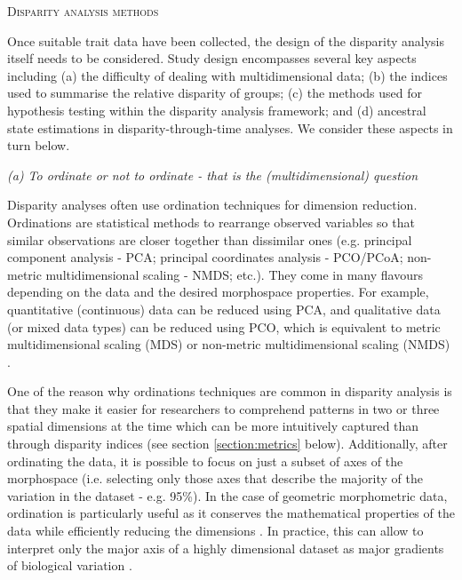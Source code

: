 \documentclass[12pt,letterpaper]{article}
\renewcommand{\section}[1]{%
\bigskip
\begin{center}
\begin{Large}
\normalfont\scshape #1
\medskip
\end{Large}
\end{center}}
\renewcommand{\subsection}[1]{%
\bigskip
\begin{center}
\begin{large}
\normalfont\itshape #1
\end{large}
\end{center}}
\begin{document}
\section{Disparity analysis methods}
\label{section:methods}

\noindent Once suitable trait data have been collected, the design of the disparity analysis itself needs to be considered.
Study design encompasses several key aspects including (a) the difficulty of dealing with multidimensional data; (b) the indices used to summarise the relative disparity of groups; (c) the methods used for hypothesis testing within the disparity analysis framework; and (d) ancestral state estimations in disparity-through-time analyses.
We consider these aspects in turn below.

\subsection{(a) To ordinate or not to ordinate - that is the (multidimensional) question}
\label{section:ordination}

Disparity analyses often use ordination techniques for dimension reduction.
Ordinations are statistical methods to rearrange observed variables so that similar observations are closer together than dissimilar ones (e.g. principal component analysis - PCA; principal coordinates analysis - PCO/PCoA; non-metric multidimensional scaling - NMDS; etc.).
They come in many flavours depending on the data and the desired morphospace properties.
For example, quantitative (continuous) data can be reduced using PCA, and qualitative data (or mixed data types) can be reduced using PCO, which is equivalent to metric multidimensional scaling (MDS) or non-metric multidimensional scaling (NMDS) \citep[see][chapter 9 for a detailed overview of ordination methods and properties]{Legendre2012-va}.

One of the reason why ordinations techniques are common in disparity analysis is that they make it easier for researchers to comprehend patterns in two or three spatial dimensions at the time which can be more intuitively captured than through disparity indices (see section \ref{section:metrics} below).
Additionally, after ordinating the data, it is possible to focus on just a subset of axes of the morphospace (i.e. selecting only those axes that describe the majority of the variation in the dataset - e.g. 95\%).
In the case of geometric morphometric data, ordination is particularly useful as it conserves the mathematical properties of the data while efficiently reducing the dimensions \citep{Legendre2012-va,dryden2016statistical}.
In practice, this can allow to interpret only the major axis of a highly dimensional dataset as major gradients of biological variation \citep[e.g. the elongation and flattening of birds beaks;][]{Cooney2017-ly}.
\end{document}
